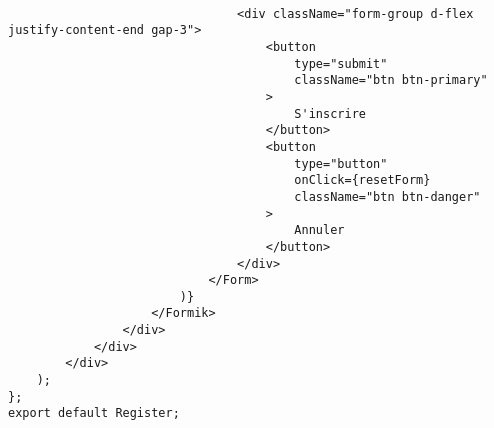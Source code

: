 \documentclass[10pt,a4paper]{article}
\begin{document}
\begin{verbatim}
                               
                                <div className="form-group d-flex justify-content-end gap-3">
                                    <button
                                        type="submit"
                                        className="btn btn-primary"
                                    >
                                        S'inscrire
                                    </button>
                                    <button
                                        type="button"
                                        onClick={resetForm}
                                        className="btn btn-danger"
                                    >
                                        Annuler
                                    </button>
                                </div>
                            </Form>
                        )}
                    </Formik>
                </div>
            </div>
        </div>
    );
};   
export default Register;

\end{verbatim}
\end{document}
